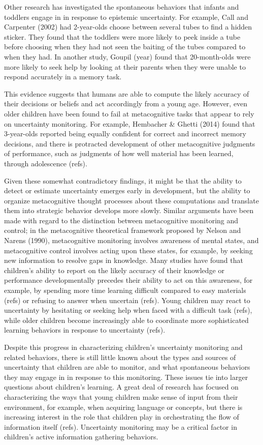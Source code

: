 \documentclass[10pt, letterpaper]{article}
\begin{document}
Other research has investigated the spontaneous behaviors that infants
and toddlers engage in in response to epistemic uncertainty. For
example, Call and Carpenter (2002) had 2-year-olds choose between
several tubes to find a hidden sticker. They found that the toddlers
were more likely to peek inside a tube before choosing when they had not
seen the baiting of the tubes compared to when they had. In another
study, Goupil (year) found that 20-month-olds were more likely to seek
help by looking at their parents when they were unable to respond
accurately in a memory task.

This evidence suggests that humans are able to compute the likely
accuracy of their decisions or beliefs and act accordingly from a young
age. However, even older children have been found to fail at
metacognitive tasks that appear to rely on uncertainty monitoring. For
example, Hembacher \& Ghetti (2014) found that 3-year-olds reported
being equally confident for correct and incorrect memory decisions, and
there is protracted development of other metacognitive judgments of
performance, such as judgments of how well material has been learned,
through adolescence (refs).

Given these somewhat contradictory findings, it might be that the
ability to detect or estimate uncertainty emerges early in development,
but the ability to organize metacognitive thought processes about these
computations and translate them into strategic behavior develops more
slowly. Similar arguments have been made with regard to the distinction
between metacognitive monitoring and control; in the metacognitive
theoretical framework proposed by Nelson and Narens (1990),
metacognitive monitoring involves awareness of mental states, and
metacognitive control involves acting upon these states, for example, by
seeking new information to resolve gaps in knowledge. Many studies have
found that children's ability to report on the likely accuracy of their
knowledge or performance developmentally precedes their ability to act
on this awareness, for example, by spending more time learning difficult
compared to easy materials (refs) or refusing to answer when uncertain
(refs). Young children may react to uncertainty by hesitating or seeking
help when faced with a difficult task (refs), while older children
become increasingly able to coordinate more sophisticated learning
behaviors in response to uncertainty (refs).

Despite this progress in characterizing children's uncertainty
monitoring and related behaviors, there is still little known about the
types and sources of uncertainty that children are able to monitor, and
what spontaneous behaviors they may engage in in response to this
monitoring. These issues tie into larger questions about children's
learning. A great deal of research has focused on characterizing the
ways that young children make sense of input from their environment, for
example, when acquiring language or concepts, but there is increasing
interest in the role that children play in orchestrating the flow of
information itself (refs). Uncertainty monitoring may be a critical
factor in children's active information gathering behaviors.
\end{document}
